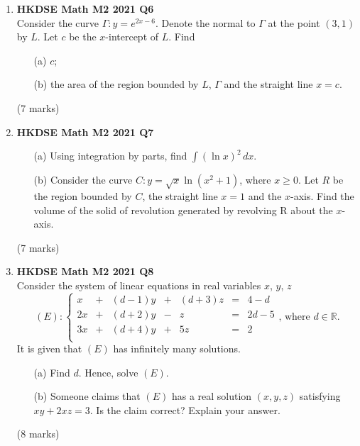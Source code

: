 \documentclass[12pt]{article}
\begin{document}
\begin{enumerate}
	\item \textbf{HKDSE Math M2 2021 Q6}\\
	Consider the curve $\Gamma : y = e^{2x-6}$. Denote the normal to $\Gamma$ at the point $(3,1)$ by $L$. Let $c$ be the $x$-intercept of $L$. Find
	\begin{enumerate}
		\item [(a)]$c$;
		\item [(b)]the area of the region bounded by $L$, $\Gamma$ and the straight line $x=c$.
	\end{enumerate}
	(7 marks)

	\item \textbf{HKDSE Math M2 2021 Q7}
	\begin{enumerate}
		\item [(a)]Using integration by parts, find $\displaystyle\int (\ln{x})^2 \,dx$.
		\item [(b)] Consider the curve $\displaystyle C : y = \sqrt{x}\ln{(x^2+1)}$, where $x\geq 0$. Let $R$ be the region bounded by $C$, the straight line $x=1 $ and the $x$-axis. Find the volume of the solid of revolution generated by revolving R about the $x$-axis.
	\end{enumerate}
	(7 marks)

	\item \textbf{HKDSE Math M2 2021 Q8}\\
	Consider the system of linear equations in real variables $x$, $y$, $z$
		$$(E) : \left\{\begin{matrix}
		x&  +&(d-1)y&  +&(d+3)z& = &4-d  \\
		2x&  +&(d+2)y&  -&z& = & 2d-5 \\
		3x&  +&(d+4)y&  +&5z& = & 2 \\
		\end{matrix}\right. \text{,  where } d \in \mathbb{R} .$$
		It is given that $(E)$ has infinitely many solutions.
	\begin{enumerate}
		\item [(a)] Find $d$. Hence, solve $(E)$.
		\item [(b)] Someone claims that $(E)$ has a real solution $(x,y,z)$ satisfying $xy + 2xz = 3$. Is the claim correct? Explain your answer. 
	\end{enumerate}
	(8 marks)


\end{enumerate}
\end{document}
